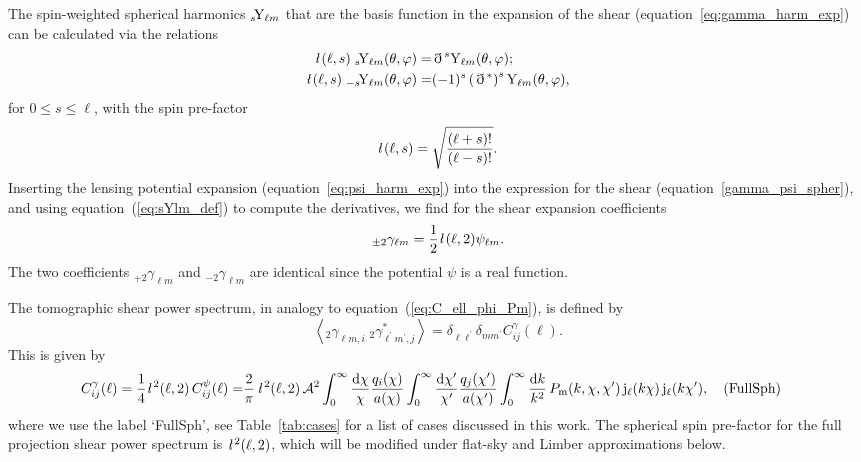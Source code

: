 \documentclass[fleqn,usenatbib]{mnras} %
\newcommand{\ellbar}{\hbox{\it \l}\,}
\newcommand{\pref}{{\cal A}}
\newcommand{\edth}{\,\eth\,}
\newcommand{\Label}[1]{\quad (\mbox{#1})}
\begin{document}
%
The spin-weighted spherical harmonics $_s\!{\rm Y}_{\ell m}$ that are the basis function
in the expansion of the shear (equation~\ref{eq:gamma_harm_exp}) can be calculated via the relations
%
%
\begin{align}
  \ellbar(\ell, s) \; _s\!{\rm Y}_{\ell m}(\theta, \varphi) = & \edth^s {\rm Y}_{\ell m}(\theta, \varphi);
    \nonumber \\
  \ellbar(\ell, s) \; _{-s}\!{\rm Y}_{\ell m}(\theta, \varphi) = & (-1)^s \left(\edth^\ast\right)^s {\rm Y}_{\ell m}(\theta, \varphi),
  \label{eq:sYlm_def} 
\end{align}
%
for $0 \le s \le \ell$, with the spin pre-factor \citep{2012PhRvD..86b3001B}
%
\begin{equation}
  \ellbar(\ell, s) = \sqrt{\frac{(\ell + s)!}{(\ell - s)!}}.
  \label{eq:ellbar}
\end{equation} 
%
Inserting the lensing potential expansion (equation~\ref{eq:psi_harm_exp}) into the
expression for the shear (equation~\ref{gamma_psi_spher}), and using equation~(\ref{eq:sYlm_def})
to compute the derivatives, we find for the shear expansion coefficients
\citep{2000PhRvD..62d3007H,2001astro.ph.11605T}
%
%
\begin{equation}
  _{\pm 2} \gamma_{\ell m} = \frac 1 2 \ellbar(\ell, 2) \psi_{\ell m}.
  \label{eq:gamma_ellm_phi_ellm}
\end{equation}
%
The two coefficients $_{+2} \gamma_{\ell m}$ and $_{-2} \gamma_{\ell m}$ are
identical since the potential $\psi$ is a real function.

The tomographic shear power spectrum, in analogy to equation~(\ref{eq:C_ell_phi_Pm}), is defined by
%
\begin{equation}
  \left\langle _2\gamma^{}_{\ell m, i} \; {}_2\gamma^\ast_{\ell^\prime m^\prime, j} \right\rangle
    = \delta_{\ell \ell^\prime} \delta_{m m^\prime} C^\gamma_{ij}(\ell).
  \label{eq:C_ell_gamma}
\end{equation}
%
This is given by
%
\begin{align}
  C^\gamma_{ij}(\ell) = \frac 1 4 \ellbar^2(\ell, 2) \, C^\psi_{ij}(\ell)
                 = & \frac 2 \pi \, \ellbar^2(\ell, 2) \, \pref^2
                 \int_{0}^\infty \frac{\rm d \chi}{\chi} \frac{q_i(\chi)}{a(\chi)}
                \int_{0}^\infty \frac{\rm d \chi^\prime}{\chi^\prime}
                \frac{q_j(\chi^\prime)}{a(\chi^\prime)}
                \int_0^\infty \frac{{\rm d} k}{k^2} \, P_{\rm m}(k, \chi, \chi^\prime) \,
                {\rm j}_\ell(k \chi) \, {\rm j}_\ell(k \chi^\prime), \Label{FullSph}
  \label{eq:C_ell_full}
\end{align}
%
where we use the label `FullSph', see Table~\ref{tab:cases} for a list of cases discussed in this work.
The spherical spin pre-factor for the full projection shear power
spectrum is $\ellbar^2(\ell, 2)$, which will be modified under
flat-sky and Limber approximations below.
\end{document}
